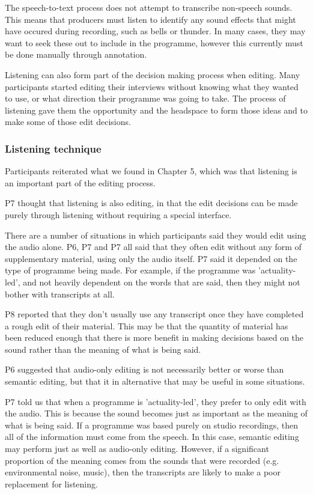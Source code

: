 The speech-to-text process does not attempt to transcribe non-speech sounds. This means that producers must listen to
identify any sound effects that might have occured during recording, such as bells or thunder. In many cases, they may
want to seek these out to include in the programme, however this currently must be done manually through annotation.


Listening can also form part of the decision making process when editing. Many participants started editing their
interviews without knowing what they wanted to use, or what direction their programme was going to take. The process of
listening gave them the opportunity and the headspace to form those ideas and to make some of those edit decisions.

\subsubsection{Listening technique}

Participants reiterated what we found in Chapter 5, which was that listening is an important part of the editing
process.

P7 thought that listening is also editing, in that the edit decisions can be made purely through listening without
requiring a special interface.


There are a number of situations in which participants said they would edit using the audio alone. P6, P7 and P7 all
said that they often edit without any form of supplementary material, using only the audio itself. P7 said it depended
on the type of programme being made. For example, if the programme was 'actuality-led', and not heavily dependent on
the words that are said, then they might not bother with transcripts at all.

P8 reported that they don't usually use any transcript once they have completed a rough edit of their material. This
may be that the quantity of material has been reduced enough that there is more benefit in making decisions based on
the sound rather than the meaning of what is being said.

P6 suggested that audio-only editing is not necessarily better or worse than semantic editing, but that it in
alternative that may be useful in some situations.

P7 told us that when a programme is 'actuality-led', they prefer to only edit with the audio. This is because the sound
becomes just as important as the meaning of what is being said. If a programme was based purely on studio recordings,
then all of the information must come from the speech. In this case, semantic editing may perform just as well as
audio-only editing. However, if a significant proportion of the meaning comes from the sounds that were recorded (e.g.
environmental noise, music), then the transcripts are likely to make a poor replacement for listening.

